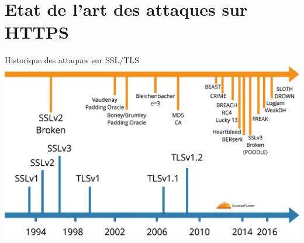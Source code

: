 \section{Etat de l'art des attaques sur HTTPS}


\begin{frame}{Historique des attaques sur SSL/TLS}
    \includegraphics[width=\linewidth]{../medias/history-tls-attacks.png}
\end{frame}


